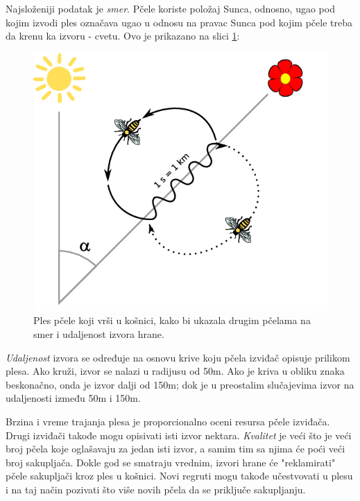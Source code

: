 \documentclass[a4paper]{article}
\begin{document}
{Najsloženiji podatak je {\em smer}. Pčele koriste položaj Sunca, odnosno, ugao pod kojim izvodi ples označava ugao u odnosu na pravac Sunca pod kojim pčele treba da krenu ka izvoru - cvetu. Ovo je prikazano na slici \ref{fig:pcela2}:

\begin{figure}[h!]
\begin{center}
\includegraphics[scale=0.35]{waggle_dance.png}
\end{center}
\caption{Ples pčele koji vrši u košnici, kako bi ukazala drugim pčelama na smer i udaljenost izvora hrane.}
\label{fig:pcela2}
\end{figure}

{\em Udaljenost} izvora se određuje na osnovu krive koju pčela izviđač opisuje prilikom plesa. Ako kruži, izvor se nalazi u radijusu od 50m. Ako je kriva u obliku znaka beskonačno, onda je izvor dalji od 150m; dok je u preostalim slučajevima izvor na udaljenosti između 50m i 150m\cite{plespcela}.

Brzina i vreme trajanja plesa je proporcionalno oceni resursa pčele izviđača. Drugi izviđači takođe mogu opisivati isti izvor nektara. {\em Kvalitet} je veći što je veći broj pčela koje oglašavaju za jedan isti izvor, a samim tim sa njima će poći veći broj sakupljača\cite{bcoalg}. Dokle god se smatraju vrednim, izvori hrane će "reklamirati" pčele sakupljači kroz ples u košnici. Novi regruti mogu takođe učestvovati u plesu i na taj način pozivati što više novih pčela da se priključe sakupljanju. 

}
\end{document}
